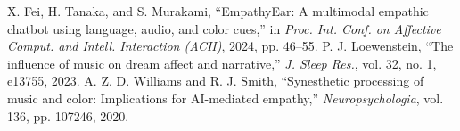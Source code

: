 \documentclass[conference]{IEEEtran}
\begin{document}
\begin{thebibliography}{00}
         X. Fei, H. Tanaka, and S. Murakami, ``EmpathyEar: A multimodal empathic chatbot using language, audio, and color cues,'' in \textit{Proc. Int. Conf. on Affective Comput. and Intell. Interaction (ACII)}, 2024, pp. 46--55.
         P. J. Loewenstein, ``The influence of music on dream affect and narrative,'' \textit{J. Sleep Res.}, vol. 32, no. 1, e13755, 2023.
         A. Z. D. Williams and R. J. Smith, ``Synesthetic processing of music and color: Implications for AI-mediated empathy,'' \textit{Neuropsychologia}, vol. 136, pp. 107246, 2020.
	\end{thebibliography}
\end{document}
